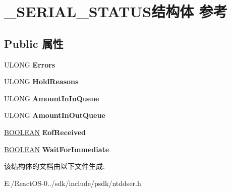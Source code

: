 \hypertarget{struct___s_e_r_i_a_l___s_t_a_t_u_s}{}\section{\+\_\+\+S\+E\+R\+I\+A\+L\+\_\+\+S\+T\+A\+T\+U\+S结构体 参考}
\label{struct___s_e_r_i_a_l___s_t_a_t_u_s}
\subsection*{Public 属性}
\begin{DoxyCompactItemize}
\item 
\mbox{\label{struct___s_e_r_i_a_l___s_t_a_t_u_s_a0179f4603d5085df9f44362f18973615}} 
U\+L\+O\+NG {\bfseries Errors}
\item 
\mbox{\label{struct___s_e_r_i_a_l___s_t_a_t_u_s_a6148e2c8c9c7d42c2f3d9f1ccc86894d}} 
U\+L\+O\+NG {\bfseries Hold\+Reasons}
\item 
\mbox{\label{struct___s_e_r_i_a_l___s_t_a_t_u_s_aa61af64201c9f48c7680954dbbcf3e0e}} 
U\+L\+O\+NG {\bfseries Amount\+In\+In\+Queue}
\item 
\mbox{\label{struct___s_e_r_i_a_l___s_t_a_t_u_s_ad42c1ee98b1863774c9a8804c99e968b}} 
U\+L\+O\+NG {\bfseries Amount\+In\+Out\+Queue}
\item 
\mbox{\label{struct___s_e_r_i_a_l___s_t_a_t_u_s_a2803cb45b6b47c259e47e13a75604212}} 
\hyperlink{_processor_bind_8h_a112e3146cb38b6ee95e64d85842e380a}{B\+O\+O\+L\+E\+AN} {\bfseries Eof\+Received}
\item 
\mbox{\label{struct___s_e_r_i_a_l___s_t_a_t_u_s_a3f38e0048c19155a74f5cf8fd925c1da}} 
\hyperlink{_processor_bind_8h_a112e3146cb38b6ee95e64d85842e380a}{B\+O\+O\+L\+E\+AN} {\bfseries Wait\+For\+Immediate}
\end{DoxyCompactItemize}


该结构体的文档由以下文件生成\+:\begin{DoxyCompactItemize}
\item 
E\+:/\+React\+O\+S-\/0../sdk/include/psdk/ntddser.\+h\end{DoxyCompactItemize}
